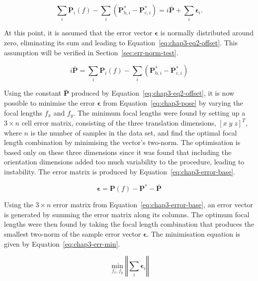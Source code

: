\begin{equation}
  \label{eq:chap3-eq1-offset}
  \sum\limits_i \bm{P}_i(f) - \sum\limits_i(\bm{P}^*_{\mathrm{b},i} - \bm{P}^*_{\mathrm{c}, i}) = i\bar{\bm{P}} + \sum\limits_i\bm{\epsilon}_i.
\end{equation}

At this point, it is assumed that the error vector $\bm{\epsilon}$ is normally distributed around zero, eliminating its sum and leading to Equation~\ref{eq:chap3-eq2-offset}. This assumption will be verified in Section~\ref{sec:err-norm-test}. 

\begin{equation}
  \label{eq:chap3-eq2-offset}
  i\bar{\bm{P}} = \sum\limits_i \bm{P}_i(f) - \sum\limits_i(\bm{P}^*_{\mathrm{b},i} - \bm{P}^*_{\mathrm{c}, i})
\end{equation}

Using the constant $\bar{\bm{P}}$ produced by Equation~\ref{eq:chap3-eq2-offset}, it is now possible to minimise the error $\bm{\epsilon}$ from Equation~\ref{eq:chap3-pose} by varying the focal lengths $f_x$ and $f_y$. The minimum focal lengths were found by setting up a $3\times n$ cell error matrix, consisting of the three translation dimensions, ${[x\;y\;z]}^T$, where $n$ is the number of samples in the data set, and find the optimal focal length combination by minimising the vector's two-norm. The optimisation is based only on these three dimensions since it was found that including the orientation dimensions added too much variability to the procedure, leading to instability. The error matrix is produced by Equation~\ref{eq:chap3-error-base}.

\begin{equation}
  \label{eq:chap3-error-base}
  \bm{\epsilon} = \bm{P}(f) - \bm{P}^* - \bar{\bm{P}}
\end{equation}

Using the $3\times n$ error matrix from Equation~\ref{eq:chap3-error-base}, an error vector is generated by summing the error matrix along its columns. The optimum focal lengths were then found by taking the focal length combination that produces the smallest two-norm of the sample error vector $\bm{\epsilon}$. The minimisation equation is given by Equation~\ref{eq:chap3-err-min}.

\begin{equation}
  \label{eq:chap3-err-min}
  \min_{f_x, f_y}\left \Vert \sum_i  \bm{\epsilon}_i \right \Vert
\end{equation}

